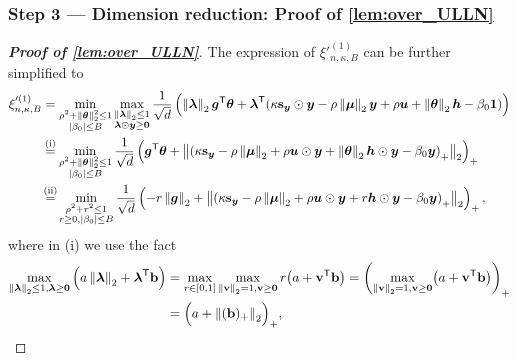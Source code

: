 \subsubsection{Step 3 --- Dimension reduction: Proof of \cref{lem:over_ULLN}}
\label{subsubsec:over_ULLN}
\begin{proof}[\textbf{Proof of \cref{lem:over_ULLN}}]
The expression of $\xi'^{(1)}_{n, \kappa, B}$ can be further simplified to
\begin{align*}
        \xi'^{(1)}_{n, \kappa, B}
        & = \min_{ \substack{ \rho^2 + \norm{\vtheta}_2^2 \le 1 \\ \abs{\beta_0} \le B } } \max_{ \substack{ \norm{\blambda}_2 \le 1 \\ \blambda \odot \yy \ge \bzero} } \frac{1}{\sqrt{d}} \left( \norm{\blambda}_2 \vg^\top \btheta +
        \blambda^\top ( \kappa \bs_\yy \odot \yy - \rho \norm{\bmu}_2 \yy + \rho \uu 
        + \norm{\btheta}_2 \vh - \beta_0 \bone )  \right)  \\
        & \overset{\mathmakebox[0pt][c]{\text{(i)}}}{=} 
        \min_{ \substack{ \rho^2 + \norm{\vtheta}_2^2 \le 1 \\ \abs{\beta_0} \le B } } \frac{1}{\sqrt{d}} \left( \vg^\top \btheta + \bigl\| \left( 
            \kappa \bs_\yy - \rho \norm{\bmu}_2 + \rho \uu \odot \yy
        + \norm{\vtheta}_2 \vh \odot \yy - \beta_0 \yy
         \right)_+ \bigr\|_2  \right)_+ \\
        & \overset{\mathmakebox[0pt][c]{\text{(ii)}}}{=}
         \min_{ \substack{ \rho^2 + r^2 \le 1 \\ r \ge 0, \abs{\beta_0} \le B } } \frac{1}{\sqrt{d}} \left( 
            - r \norm{\vg}_2 + \bigl\| \left( 
            \kappa \bs_\yy - \rho \norm{\bmu}_2 + \rho \uu \odot \yy
        + r \vh \odot \yy - \beta_0 \yy
         \right)_+ \bigr\|_2  \right)_+,
\end{align*}
where in (i) we use the fact
\begin{equation*}
    \begin{aligned}
        \max_{\left\|{\text{\boldmath $\lambda$}}\right\|_2 \le 1, \text{\boldmath $\lambda$} \ge \mathrm{\bf 0}} 
    \left( a \left\|{\text{\boldmath $\lambda$}}\right\|_2 + \text{\boldmath $\lambda$}^{\sf T} \mathrm{\bf b} \right)
    & = \max_{r \in [0, 1]} \max_{\left\|{\mathrm{\bf v}}\right\|_2 = 1, \mathrm{\bf v} \ge \mathrm{\bf 0}} 
    r \bigl( a + \mathrm{\bf v}^{\sf T} \mathrm{\bf b} \bigr)
    = \left( \max_{\left\|{\mathrm{\bf v}}\right\|_2 = 1, \mathrm{\bf v} \ge \mathrm{\bf 0}} \bigl( a + \mathrm{\bf v}^{\sf T} \mathrm{\bf b} \bigr) \right)_+
    \\
    & = \Bigl( a + \left\|{(\mathrm{\bf b})_+}\right\|_2 \Bigr)_+,
    \end{aligned}
\end{equation*}

\end{proof}
